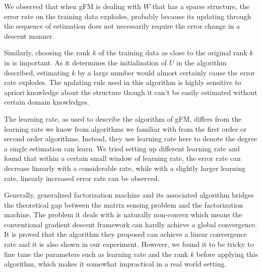 \documentclass{article}
\begin{document}
We observed that when gFM is dealing with $W$ that has a sparse structure, the error rate on the training data explodes, probably because its updating through the sequence of estimation does not necessarily require the error change in a descent manner.

Similarly, choosing the rank $k$ of the training data as close to the original rank $k$ in is important. As it determines the initialization of $U$ in the algorithm described, estimating $k$ by a large number would almost certainly cause the error rate explodes. The updating rule used in this algorithm is highly sensitive to apriori knowledge about the structure though it can't be easily estimated without certain domain knowledges.

The learning rate, as used to describe the algorithm of gFM, differs from the learning rate we know from algorithms we familiar with from the first order or second order algorithms. Instead, they use learning rate here to denote the degree a single estimation can learn. We tried setting up different learning rate and found that within a certain small window of learning rate, the error rate can decrease linearly with a considerable rate, while with a slightly larger learning rate, linearly increased error rate can be observed.

Generally, generalized factorization machine and its associated algorithm bridges the theoretical gap between the matrix sensing problem and the factorization machine. The problem it deals with is naturally non-convex which means the conventional gradient descent framework can hardly achieve a global convergence. It is proved that the algorithm they proposed can achieve a linear convergence rate and it is also shown in our experiment. However, we found it to be tricky to fine tune the parameters such as learning rate and the rank $k$ before applying this algorithm, which makes it somewhat impractical in a real world setting.
\end{document}
